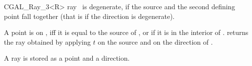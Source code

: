 \begin {classtemplate} {CGAL_Ray_3<R>}
       {ray \var\ is degenerate, if the source and the second defining
        point fall together (that is if the direction is degenerate).}


       {A point is on \var, iff it is equal to the source 
        of \var, or if it is in the interior of \var.}
% 
% 
       {returns the ray obtained by applying $t$ on the source 
        and on the direction of \var.}

\implementation

A ray is stored as a point and a direction.


\end {classtemplate} 

%
%
%
